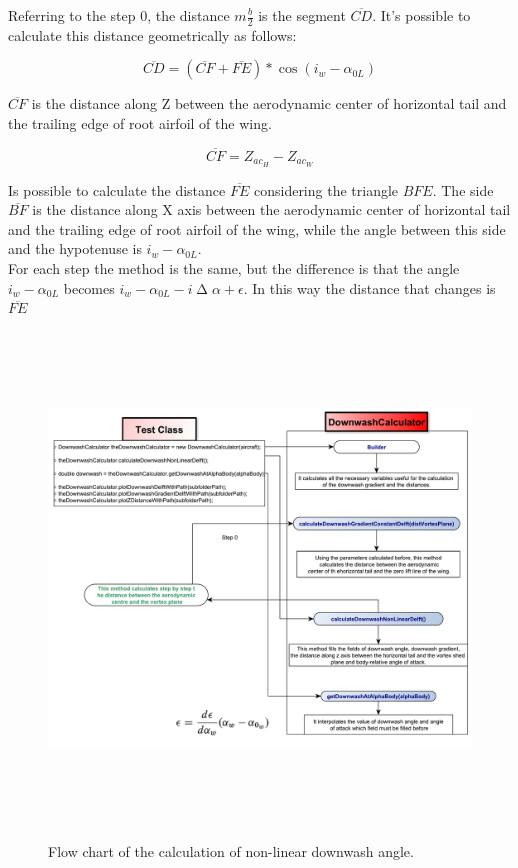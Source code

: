 Referring to the step 0, the distance $m  \frac{b}{2}$ is the segment $\overline{CD}$. It's possible to calculate this distance geometrically as follows:

\begin{equation}
\overline{CD} = ( \overline{CF} + \overline{FE} ) * \cos ({i_w -\alpha_{0L}})
\end{equation}

$\overline{CF}$ is the distance along Z between the aerodynamic center of horizontal tail and the trailing edge of root airfoil of the wing.

\begin{equation}
\overline{CF} =Z_{ac_{H}}-Z_{ac_{W}}
\end{equation}

Is possible to calculate the distance $\overline{FE}$ considering the triangle $BFE$. The side  $\overline{BF}$ is the distance along X axis between the aerodynamic center of horizontal tail and the trailing edge of root airfoil of the wing, while the angle between this side and the hypotenuse is $i_w -\alpha_{0L}$.\\

For each step the method is the same, but the difference is that the angle  $i_w -\alpha_{0L}$  becomes $i_w -\alpha_{0L} -i\upDelta\alpha + \epsilon$. In this way the distance that changes is $\overline{FE}$

\begin{figure}[H]
\centering
{\includegraphics[height=13cm]{Immagini/nonlinear_2.pdf}} 
\caption{Flow chart of the calculation of non-linear downwash angle.}
\label{flowchartangles}
\end{figure} 


